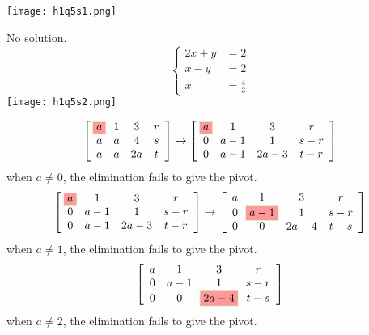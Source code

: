 \documentclass[11pt]{homework}
\begin{document}
    \question
    \begin{arabicparts}
        \questionpart
    
    \texttt{[image: h1q5s1.png]}

    No solution.\\
    \questionpart
    \begin{equation}
        \begin{cases}
            2x+y&=2\\
            x-y&=2\\
            x&=\frac{4}{3}
        \end{cases}
    \end{equation}
        \texttt{[image: h1q5s2.png]}


    
    \end{arabicparts}
    \question
    \begin{equation}
        \left[\begin{array}{cccc}
        \hlight{a} & 1 & 3 & r \\ 
        a & a & 4 & s \\ 
        a & a & 2a & t
        \end{array}\right]
        \to
        \left[\begin{array}{cccc}
        \hlight{a} & 1 & 3 & r \\ 
        0 & a-1 & 1 & s-r \\ 
        0 & a-1 & 2a-3 & t-r
        \end{array}\right]
    \end{equation}
    when $a\neq0$, the elimination fails to give the pivot.
    \begin{equation}
        \left[\begin{array}{cccc}
            \hlight{a} & 1 & 3 & r \\ 
            0 & a-1 & 1 & s-r \\ 
            0 & a-1 & 2a-3 & t-r
            \end{array}\right]
        \to
        \left[\begin{array}{cccc}
        a & 1 & 3 & r \\ 
        0 & \hlight{a-1} & 1 & s-r \\ 
        0 & 0 & 2a-4 & t-s
        \end{array}\right]
    \end{equation}
    when $a\neq1$, the elimination fails to give the pivot.
    \begin{equation}
        \left[\begin{array}{cccc}
            a & 1 & 3 & r \\ 
            0 & a-1 & 1 & s-r \\ 
            0 & 0 & \hlight{2a-4} & t-s
            \end{array}\right]
    \end{equation}
    when $a\neq2$, the elimination fails to give the pivot.
\end{document}

